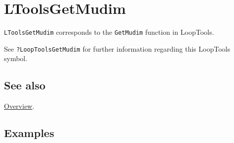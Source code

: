 \documentclass[../FeynHelpersManual.tex]{subfiles}
\begin{document}
\hypertarget{ltoolsgetmudim}{
\section{LToolsGetMudim}\label{ltoolsgetmudim}}

\texttt{LToolsGetMudim} corresponds to the \texttt{GetMudim} function in
LoopTools.

See \texttt{?LoopTools\textasciigrave GetMudim} for further information
regarding this LoopTools symbol.

\subsection{See also}

\hyperlink{toc}{Overview}.

\subsection{Examples}
\end{document}
